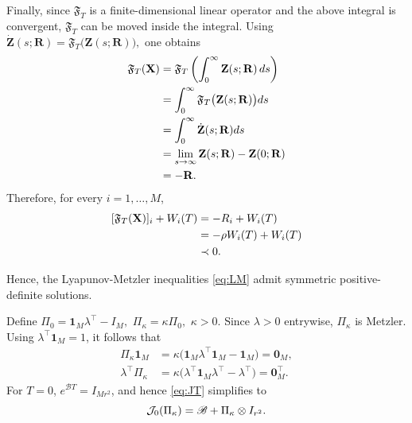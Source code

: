 \documentclass[conference]{IEEEtran}
\begin{document}
\begin{IEEEproof}
		Finally, since $\mathfrak F_T$ is a finite-dimensional linear
		operator and the above integral is convergent,
		$\mathfrak F_T$ can be moved inside the integral. Using
		$
		\dot{\mathbf Z}(s;\mathbf R)
		=
		\mathfrak F_T
		\bigl(
		\mathbf Z(s;\mathbf R)
		\bigr),
		$
		one obtains
		\vspace{-0.2\baselineskip}
		\begin{align*}
			\mathfrak F_T(\mathbf X)
			&=
			\mathfrak F_T
			\left(
			\int_0^\infty
			\mathbf Z(s;\mathbf R)\,ds
			\right)\\
			&=
			\int_0^\infty
			\mathfrak F_T
			\bigl(
			\mathbf Z(s;\mathbf R)
			\bigr)
			ds\\
			&=
			\int_0^\infty
			\dot{\mathbf Z}(s;\mathbf R)
			ds\\
			&=
			\lim_{s\to\infty}
			\mathbf Z(s;\mathbf R)
			-
			\mathbf Z(0;\mathbf R)\\
			&=
			-\mathbf R.	
			\vspace{-0.2\baselineskip}		
		\end{align*}
		Therefore, for every $i=1,\ldots,M$,
		\vspace{-0.2\baselineskip}
		\[
		\begin{aligned}
			[\mathfrak F_T(\mathbf X)]_i
			+
			W_i(T)
			&=
			-R_i+W_i(T)\\
			&=
			-\rho W_i(T)+W_i(T)\\
			&\prec0.
		\end{aligned}		
		\vspace{-0.2\baselineskip}
		\]
		
		Hence, the Lyapunov-Metzler inequalities \eqref{eq:LM}
		admit symmetric positive-definite solutions.
	\end{IEEEproof}
	
	Define
	$
	\Pi_0 = \mathbf{1}_M\lambda^\top - I_M,
	$
	$
	\Pi_\kappa = \kappa\Pi_0,
	$
	$
	\kappa>0.
	$
	Since $\lambda>0$ entrywise, $\Pi_\kappa$ is Metzler. Using $\lambda^\top\mathbf{1}_M=1$, it follows that
	\vspace{-0.2\baselineskip}
	\begin{align*}
		\Pi_\kappa\mathbf 1_M
		&=
		\kappa
		\bigl(
		\mathbf 1_M\lambda^\top\mathbf 1_M-\mathbf 1_M
		\bigr)
		=
		\mathbf 0_M,\\
		\lambda^\top\Pi_\kappa
		&=
		\kappa
		\bigl(
		\lambda^\top\mathbf 1_M\lambda^\top-\lambda^\top
		\bigr)
		=
		\mathbf 0_{M}^\top.
	\end{align*}
	For $T=0$, $e^{\mathscr{B}T}=I_{Mr^2}$, and hence \eqref{eq:JT} simplifies to
	\vspace{-0.2\baselineskip}
	\begin{equation}
		\mathcal J_0(\Pi_\kappa) = \mathscr{B} + \Pi_\kappa\otimes I_{r^2}.
		\label{eq:J0}
		\vspace{-0.2\baselineskip}
	\end{equation}
	
\end{document}
